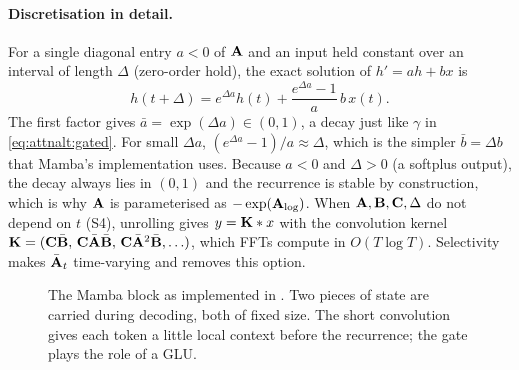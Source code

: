 \paragraph{Discretisation in detail.} For a single diagonal entry $a<0$ of $\mathbf{A}$ and an input held
constant over an interval of length $\Delta$ (zero-order hold), the exact solution of $h'=ah+bx$ is
\[
h(t+\Delta)=e^{\Delta a}h(t)+\frac{e^{\Delta a}-1}{a}\,b\,x(t).
\]
The first factor gives $\bar{a}=\exp(\Delta a)\in(0,1)$, a decay just like $\gamma$ in
\cref{eq:attnalt:gated}. For small $\Delta a$, $(e^{\Delta a}-1)/a\approx\Delta$, which is the simpler
$\bar{b}=\Delta b$ that Mamba's implementation uses. Because $a<0$ and $\Delta>0$ (a softplus output), the
decay always lies in $(0,1)$ and the recurrence is stable by construction, which is why $\mathbf{A}$ is
parameterised as $-\exp(\mathbf{A}_{\log})$. When $\mathbf{A},\mathbf{B},\mathbf{C},\Delta$ do not depend on $t$ (S4),
unrolling gives $y=\mathbf{K}*x$ with the convolution kernel
$\mathbf{K}=(\mathbf{C}\bar{\mathbf{B}},\,\mathbf{C}\bar{\mathbf{A}}\bar{\mathbf{B}},\,\mathbf{C}\bar{\mathbf{A}}^2\bar{\mathbf{B}},\ldots)$,
which FFTs compute in $O(T\log T)$. Selectivity makes $\bar{\mathbf{A}}_t$ time-varying and removes this option.

\begin{figure}[t]
\centering
{}
\caption{The Mamba block as implemented in . Two pieces of state are carried during
decoding, both of fixed size. The short convolution gives each token a little local context before the
recurrence; the gate plays the role of a GLU.}
\label{fig:attnalt:mamba}
\end{figure}

